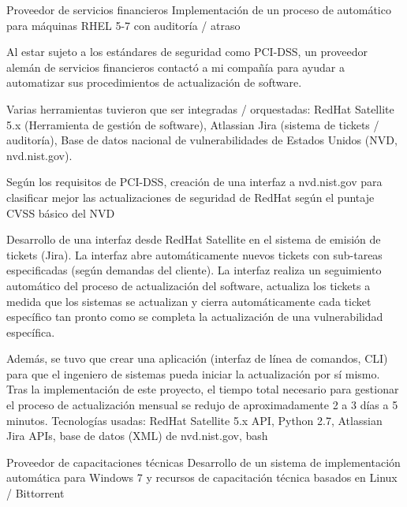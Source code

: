 \begin{cventries}
{\begin{cvitems}
      \end{cvitems}
    }

  \cventry
    {Proveedor de servicios financieros}
    {Implementación de un proceso de  automático para máquinas RHEL 5-7 con auditoría / atraso}
    {}
    {
      \begin{cvitems}
      \item  Al estar sujeto a los estándares de seguridad como PCI-DSS, un proveedor alemán de servicios
 financieros contactó a mi compañía para ayudar a automatizar sus procedimientos de actualización de
 software.
 \item  Varias herramientas tuvieron que ser integradas / orquestadas: RedHat Satellite 5.x (Herramienta
 de gestión de software), Atlassian Jira (sistema de tickets / auditoría), Base de datos nacional
 de vulnerabilidades de Estados Unidos (NVD, nvd.nist.gov).
 \item Según los requisitos de PCI-DSS, creación de una interfaz a nvd.nist.gov para clasificar mejor las actualizaciones de seguridad de
 RedHat según el puntaje CVSS básico del NVD
 \item  Desarrollo de una interfaz desde RedHat Satellite en el sistema de emisión de tickets (Jira). La
 interfaz abre automáticamente nuevos tickets con sub-tareas especificadas (según demandas del
 cliente). La interfaz realiza un seguimiento automático del proceso de actualización del software,
 actualiza los tickets a medida que los sistemas se actualizan y cierra automáticamente cada ticket
 específico tan pronto como se completa la actualización de una vulnerabilidad específica.
 \item Además, se tuvo que crear una aplicación (interfaz de línea de comandos, CLI) para que el
 ingeniero de sistemas pueda iniciar la actualización por sí mismo.
 Tras la implementación de este proyecto, el tiempo total necesario para gestionar el proceso de
 actualización mensual se redujo de aproximadamente 2 a 3 días a 5 minutos.
 Tecnologías usadas: RedHat Satellite 5.x API, Python 2.7, Atlassian Jira APIs, base de
 datos (XML) de nvd.nist.gov, bash
      \end{cvitems}
    }

  \cventry
    {Proveedor de capacitaciones técnicas}
    {Desarrollo de un sistema de implementación automática para Windows 7 y recursos de capacitación técnica basados en Linux / Bittorrent}


\end{cventries}
